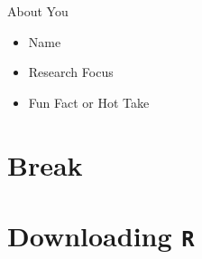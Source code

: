 \documentclass[
  ignorenonframetext,
]{beamer}
\providecommand{\tightlist}{%
  \setlength{\itemsep}{0pt}\setlength{\parskip}{0pt}}
\begin{document}
\begin{frame}{About You}
\label{about-you}
\begin{itemize}
\tightlist
\item
  Name

  \par \vspace{2.5mm}
\item
  Research Focus

  \par \vspace{2.5mm}
\item
  Fun Fact or Hot Take

  \par \vspace{2.5mm}
\end{itemize}
\end{frame}

\section{Break}\label{break}

\section{\texorpdfstring{Downloading
\texttt{R}}{Downloading }}\label{downloading}
\end{document}
